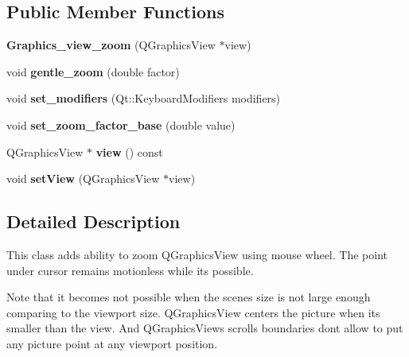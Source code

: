 \subsection*{Public Member Functions}
\begin{DoxyCompactItemize}
\item 
\mbox{\label{class_graphics__view__zoom_a8962d9b996c08023ea55a245d4003284}} 
{\bfseries Graphics\+\_\+view\+\_\+zoom} (Q\+Graphics\+View $\ast$view)
\item 
\mbox{\label{class_graphics__view__zoom_a62fb6d6b4a5cdea0cd6eaa6b7353d237}} 
void {\bfseries gentle\+\_\+zoom} (double factor)
\item 
\mbox{\label{class_graphics__view__zoom_a656c17979c1ce001255f08c9536aad7d}} 
void {\bfseries set\+\_\+modifiers} (Qt\+::\+Keyboard\+Modifiers modifiers)
\item 
\mbox{\label{class_graphics__view__zoom_a4626a602330aa9d10d23b63073c2ceb9}} 
void {\bfseries set\+\_\+zoom\+\_\+factor\+\_\+base} (double value)
\item 
\mbox{\label{class_graphics__view__zoom_a4496f751a2f9a4b45dd3f03e126eeb4a}} 
Q\+Graphics\+View $\ast$ {\bfseries view} () const
\item 
\mbox{\label{class_graphics__view__zoom_a6b19caf02a8faec2dac6eafc1bc4f822}} 
void {\bfseries set\+View} (Q\+Graphics\+View $\ast$view)
\end{DoxyCompactItemize}


\subsection{Detailed Description}
This class adds ability to zoom Q\+Graphics\+View using mouse wheel. The point under cursor remains motionless while it\textquotesingle{}s possible.

Note that it becomes not possible when the scene\textquotesingle{}s size is not large enough comparing to the viewport size. Q\+Graphics\+View centers the picture when it\textquotesingle{}s smaller than the view. And Q\+Graphics\+View\textquotesingle{}s scrolls boundaries don\textquotesingle{}t allow to put any picture point at any viewport position.

